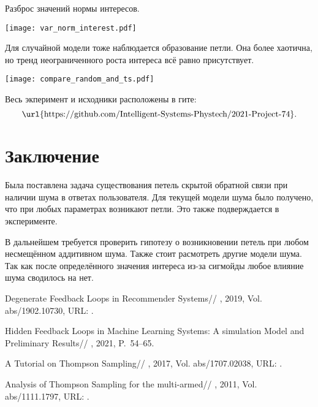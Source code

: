\documentclass[12pt, twoside]{article}
\begin{document}
Разброс значений нормы интересов. 
\begin{center}
  \texttt{[image: var\_norm\_interest.pdf]}
\end{center}

Для случайной модели тоже наблюдается образование петли. 
Она более хаотична, но тренд неограниченного роста интереса всё равно присутствует.   
\begin{center}
  \texttt{[image: compare\_random\_and\_ts.pdf]}
\end{center}


\begin{figure}[ht]
\end{figure}

Весь экперимент и исходники расположены в гите: 
\[  \text{\url{https://github.com/Intelligent-Systems-Phystech/2021-Project-74}}. \]

\section{Заключение}
Была поставлена задача существования петель скрытой обратной связи при наличии шума в ответах пользователя. 
Для текущей модели шума было получено, что при любых параметрах возникают петли. 
Это также подверждается в эксперименте.

В дальнейшем требуется проверить гипотезу о возникновении петель при любом несмещённом аддитивном шума. 
Также стоит расмотреть другие модели шума. 
Так как после определённого значения интереса из-за сигмойды любое влияние шума сводилось на нет. 
\begin{thebibliography}{99}
    Degenerate Feedback Loops in Recommender Systems//
    , 2019, Vol. abs/1902.10730,
	  URL: .

    Hidden Feedback Loops in Machine Learning Systems: A simulation Model and Preliminary Results//
    , 2021, P.~54--65.

    A Tutorial on Thompson Sampling//
    , 2017, Vol. abs/1707.02038,
	  URL: .

    Analysis of Thompson Sampling for the multi-armed//
    , 2011, Vol. abs/1111.1797,
	  URL: .
\end{thebibliography}

\end{document}
